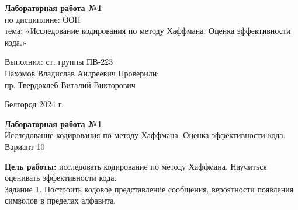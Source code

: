 \documentclass[a4paper,14pt]{extarticle}
\newcommand\textbox[1]{
	\parbox{.45\textwidth}{#1}
}
\begin{document}
\vfill
\begin{center}
    \large{
        \textbf{
            Лабораторная работа №1}}\\
    \normalsize{
        по дисциплине: ООП \\
        тема: «Исследование кодирования по методу Хаффмана. Оценка эффективности кода.»}
\end{center}
\vfill
\hfill\textbox{
    Выполнил: ст. группы ПВ-223\\Пахомов Владислав Андреевич
    \bigbreak
    Проверили: \\пр. Твердохлеб Виталий Викторович
}
\vfill\begin{center}
    Белгород 2024 г.
\end{center}
\newpage
\begin{center}
    \textbf{Лабораторная работа №1}\\
    Исследование кодирования по методу Хаффмана. Оценка эффективности кода.\\
    Вариант 10
\end{center}
\textbf{Цель работы: }исследовать кодирование по методу Хаффмана. Научиться оценивать эффективности кода.\\
Задание 1. Построить кодовое представление сообщения, вероятности
появления символов в пределах алфавита.\\
\end{document}
